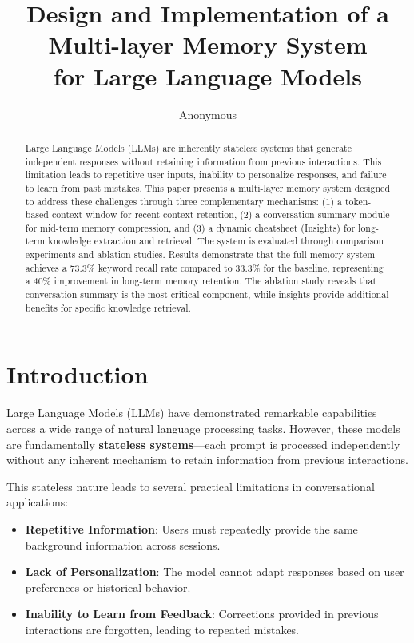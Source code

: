 \documentclass{article} %
\title{Design and Implementation of a Multi-layer Memory System \\ for Large Language Models}
\author{Anonymous}
\begin{document}
\maketitle

\begin{abstract}
Large Language Models (LLMs) are inherently stateless systems that generate independent responses without retaining information from previous interactions. This limitation leads to repetitive user inputs, inability to personalize responses, and failure to learn from past mistakes. This paper presents a multi-layer memory system designed to address these challenges through three complementary mechanisms: (1) a token-based context window for recent context retention, (2) a conversation summary module for mid-term memory compression, and (3) a dynamic cheatsheet (Insights) for long-term knowledge extraction and retrieval. The system is evaluated through comparison experiments and ablation studies. Results demonstrate that the full memory system achieves a 73.3\% keyword recall rate compared to 33.3\% for the baseline, representing a 40\% improvement in long-term memory retention. The ablation study reveals that conversation summary is the most critical component, while insights provide additional benefits for specific knowledge retrieval.
\end{abstract}

\section{Introduction}
\label{sec:intro}

Large Language Models (LLMs) have demonstrated remarkable capabilities across a wide range of natural language processing tasks. However, these models are fundamentally \textbf{stateless systems}---each prompt is processed independently without any inherent mechanism to retain information from previous interactions.

This stateless nature leads to several practical limitations in conversational applications:

\begin{itemize}
    \item \textbf{Repetitive Information}: Users must repeatedly provide the same background information across sessions.
    \item \textbf{Lack of Personalization}: The model cannot adapt responses based on user preferences or historical behavior.
    \item \textbf{Inability to Learn from Feedback}: Corrections provided in previous interactions are forgotten, leading to repeated mistakes.
\end{itemize}
\end{document}
